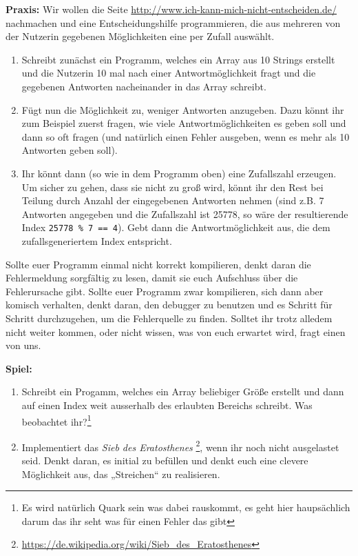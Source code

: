 \textbf{Praxis:}
Wir wollen die Seite \url{http://www.ich-kann-mich-nicht-entscheiden.de/}
nachmachen und eine Entscheidungshilfe programmieren, die aus mehreren von der
Nutzerin gegebenen Möglichkeiten eine per Zufall auswählt.

\begin{enumerate}
    \item Schreibt zunächst ein Programm, welches ein Array aus 10 Strings
        erstellt und die Nutzerin 10 mal nach einer Antwortmöglichkeit fragt
        und die gegebenen Antworten nacheinander in das Array schreibt.
    \item Fügt nun die Möglichkeit zu, weniger Antworten anzugeben. Dazu könnt
        ihr zum Beispiel zuerst fragen, wie viele Antwortmöglichkeiten es geben
        soll und dann so oft fragen (und natürlich einen Fehler ausgeben, wenn
        es mehr als 10 Antworten geben soll).
    \item Ihr könnt dann (so wie in dem Programm oben) eine Zufallszahl
        erzeugen. Um sicher zu gehen, dass sie nicht zu groß wird, könnt ihr
        den Rest bei Teilung durch Anzahl der eingegebenen Antworten nehmen
        (sind z.B. 7 Antworten angegeben und die Zufallszahl ist 25778, so wäre
        der resultierende Index \texttt{25778 \% 7 == 4}). Gebt dann die
        Antwortmöglichkeit aus, die dem zufallsgeneriertem Index
        entspricht.
\end{enumerate}

Sollte euer Programm einmal nicht korrekt kompilieren, denkt daran die
Fehlermeldung sorgfältig zu lesen, damit sie euch Aufschluss über die
Fehlerursache gibt. Sollte euer Programm zwar kompilieren, sich dann aber
komisch verhalten, denkt daran, den debugger zu benutzen und es Schritt für
Schritt durchzugehen, um die Fehlerquelle zu finden. Solltet ihr trotz alledem
nicht weiter kommen, oder nicht wissen, was von euch erwartet wird, fragt einen
von uns.

\textbf{Spiel:}
\begin{enumerate}
    \item Schreibt ein Progamm, welches ein Array beliebiger Größe erstellt und
        dann auf einen Index weit ausserhalb des erlaubten Bereichs schreibt.
        Was beobachtet ihr?\footnote{Es wird natürlich Quark sein was dabei
                rauskommt, es geht hier haupsächlich darum das ihr seht was für
                einen Fehler das gibt}
    \item Implementiert das \emph{Sieb des Eratosthenes}
        \footnote{\url{https://de.wikipedia.org/wiki/Sieb_des_Eratosthenes}},
        wenn ihr noch nicht ausgelastet seid.
        Denkt daran, es initial zu befüllen und denkt euch eine clevere
        Möglichkeit aus, das „Streichen“ zu realisieren.
\end{enumerate}



